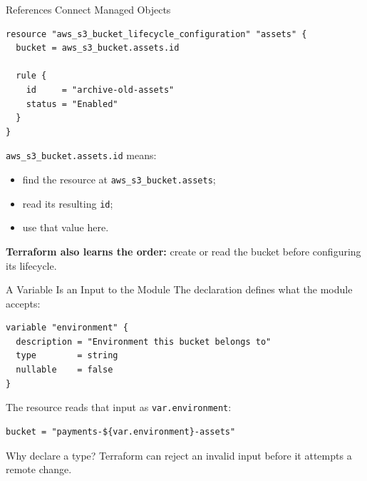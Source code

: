 \documentclass[aspectratio=169, xcolor=table]{beamer}
\begin{document}
\begin{frame}[fragile]{References Connect Managed Objects}
  \begin{lstlisting}[basicstyle=\ttfamily\scriptsize\color{CodeText}]
resource "aws_s3_bucket_lifecycle_configuration" "assets" {
  bucket = aws_s3_bucket.assets.id

  rule {
    id     = "archive-old-assets"
    status = "Enabled"
  }
}
  \end{lstlisting}

  \textcolor{SecondaryAccent}{\texttt{aws\_s3\_bucket.assets.id}} means:
  \begin{itemize}
    \item find the resource at \textcolor{SecondaryAccent}{\texttt{aws\_s3\_bucket.assets}};
    \item read its resulting \textcolor{SecondaryAccent}{\texttt{id}};
    \item use that value here.
  \end{itemize}

  \vspace{0.8em}
  \textcolor{SecondaryAccent}{\textbf{Terraform also learns the order:}}
  create or read the bucket before configuring its lifecycle.
\end{frame}

\begin{frame}[fragile]{A Variable Is an Input to the Module}
  The declaration defines what the module accepts:
  \begin{lstlisting}[basicstyle=\ttfamily\scriptsize\color{CodeText}]
variable "environment" {
  description = "Environment this bucket belongs to"
  type        = string
  nullable    = false
}
  \end{lstlisting}

  The resource reads that input as \texttt{var.environment}:
  \begin{lstlisting}[basicstyle=\ttfamily\scriptsize\color{CodeText}]
bucket = "payments-${var.environment}-assets"
  \end{lstlisting}

  \begin{block}{Why declare a type?}
    Terraform can reject an invalid input before it attempts a remote change.
  \end{block}
\end{frame}
\end{document}
